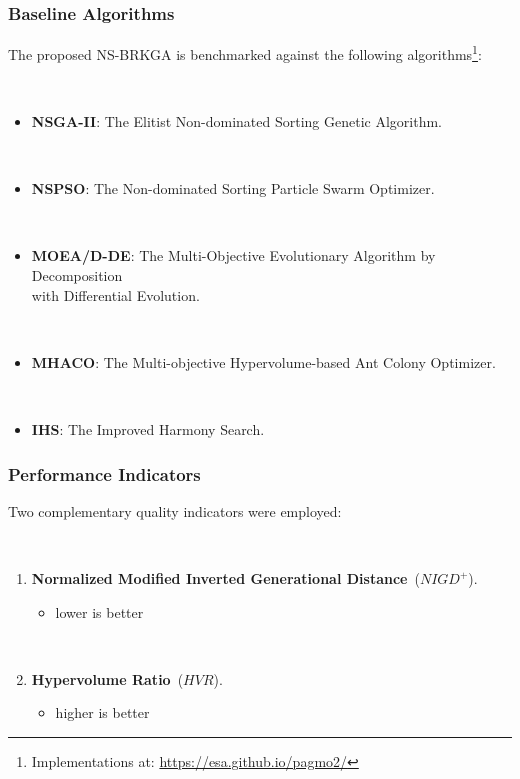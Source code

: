\documentclass[
	11pt, %
	aspectratio=169, %
]{beamer}
\newcommand{\NIGDplus}{\mathit{NIGD^{+}}}
\newcommand{\HVR}{\mathit{HVR}}
\begin{document}
\begin{frame}
\frametitle{Baseline Algorithms}


The proposed \textsc{NS-BRKGA} is benchmarked against the following algorithms\footnote{Implementations at: \href{https://esa.github.io/pagmo2/}{https://esa.github.io/pagmo2/}}:

~\\

\begin{itemize}
\item \textbf{\textsc{NSGA-II}}: The Elitist Non-dominated Sorting Genetic Algorithm.

~\\

\item \textbf{\textsc{NSPSO}}: The Non-dominated Sorting Particle Swarm Optimizer.

~\\

\item \textbf{\textsc{MOEA/D-DE}}: The Multi-Objective Evolutionary Algorithm by Decomposition\\with Differential Evolution.

~\\

\item \textbf{\textsc{MHACO}}: The Multi-objective Hypervolume-based Ant Colony Optimizer.

~\\

\item \textbf{\textsc{IHS}}: The Improved Harmony Search.
\end{itemize}
\end{frame}

\begin{frame}
\frametitle{Performance Indicators}


Two complementary quality indicators were employed:

~\\

\begin{enumerate}
\item \textbf{Normalized Modified Inverted Generational Distance}~($\NIGDplus$).
\begin{itemize}
\item lower is better
\end{itemize}

~\\

\item \textbf{Hypervolume Ratio}~($\HVR$).
\begin{itemize}
\item higher is better
\end{itemize}
\end{enumerate}
\end{frame}
\end{document}
